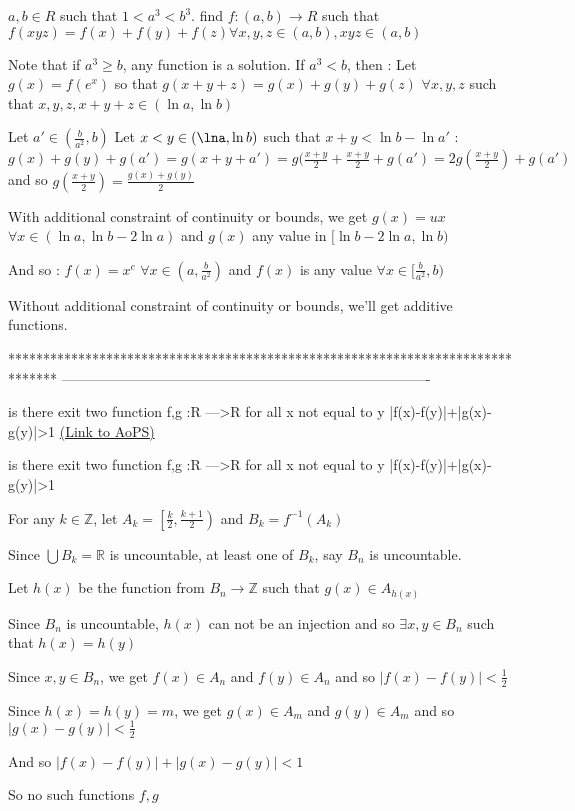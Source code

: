 \begin{solution}
	\begin{tcolorbox}$a,b \in R$ such that $1<a^3<b^3$. find $f:(a,b) \to R$ such that $f(xyz)=f(x)+f(y)+f(z) \forall x,y,z \in (a,b) ,xyz \in (a,b)$\end{tcolorbox}
Note that if $a^3\ge b$, any function is a solution.
If $a^3<b$, then :
Let $g(x)=f(e^x)$ so that $g(x+y+z)=g(x)+g(y)+g(z)$ $\forall x,y,z$ such that $x,y,z,x+y+z\in (\ln a,\ln b)$

Let $a'\in(\frac b{a^2},b)$
Let $x<y\in(\lna,\ln b)$ such that $x+y<\ln b - \ln a'$ :
$g(x)+g(y)+g(a')=g(x+y+a')=g(\frac {x+y}2+\frac{x+y}2+g(a')=2g(\frac{x+y}2)+g(a')$ and so $g(\frac{x+y}2)=\frac{g(x)+g(y)}2$

With additional constraint of continuity or bounds, we get $g(x)=ux$ $\forall x\in(\ln a,\ln b-2\ln a)$ and $g(x)$ any value in $[\ln b-2\ln a,\ln b)$

And so : 
$f(x)=x^c$ $\forall x\in(a,\frac{b}{a^2})$ and $f(x)$ is any value $\forall x\in[\frac b{a^2},b)$

Without additional constraint of continuity or bounds, we'll get additive functions.
\end{solution}
*******************************************************************************
-------------------------------------------------------------------------------

\begin{problem}
	is there exit two function
 f,g :R --->R
for all x not equal to y
|f(x)-f(y)|+|g(x)-g(y)|>1
	\flushright \href{https://artofproblemsolving.com/community/c6h568215}{(Link to AoPS)}
\end{problem}



\begin{solution}
	\begin{tcolorbox}is there exit two function
 f,g :R --->R
for all x not equal to y
|f(x)-f(y)|+|g(x)-g(y)|>1\end{tcolorbox}
For any $k\in\mathbb Z$, let $A_k=\left[\frac k2,\frac {k+1}2\right)$ and $B_k=f^{-1}(A_k)$

Since $\bigcup B_k=\mathbb R$ is uncountable, at least one of $B_k$, say $B_n$ is uncountable.

Let $h(x)$ be the function from $B_n\to\mathbb Z$ such that $g(x)\in A_{h(x)}$

Since $B_n$ is uncountable, $h(x)$ can not be an injection and so $\exists x,y\in B_n$ such that $h(x)=h(y)$

Since $x,y\in B_n$, we get $f(x)\in A_n$ and $f(y)\in A_n$ and so $|f(x)-f(y)|<\frac 12$

Since  $h(x)=h(y)=m$, we get $g(x)\in A_m$ and $g(y)\in A_m$ and so $|g(x)-g(y)|<\frac 12$

And so $|f(x)-f(y)|+|g(x)-g(y)|<1$

So no such functions $f,g$
\end{solution}



